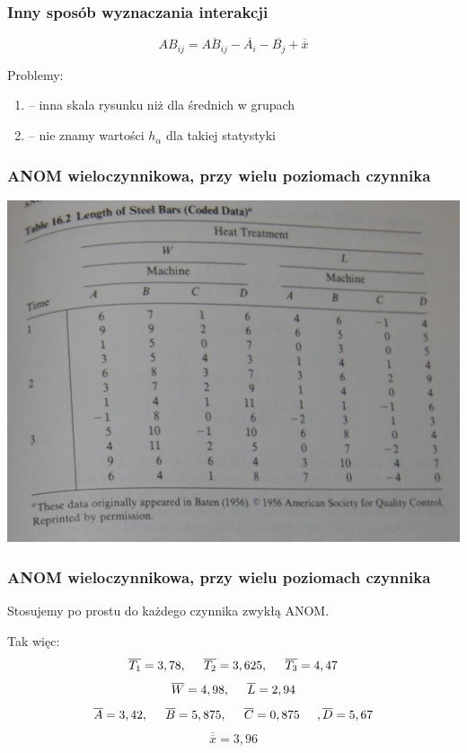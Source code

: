 \documentclass{beamer}
\begin{document}
\begin{frame}
\frametitle{Inny sposób wyznaczania interakcji}
$$
AB_{ij} =  \overline{AB_{ij}} - \overline{A_{i}} - \overline{B_{j}} + \overline{\overline{x}}
$$

\bigskip

Problemy:

\begin{enumerate}

\item[] -- inna skala rysunku niż dla średnich w grupach
\item[] -- nie znamy wartości $h_\alpha$ dla takiej statystyki

\end{enumerate}
\end{frame}

\begin{frame}
\frametitle{ANOM wieloczynnikowa, przy wielu poziomach czynnika}
\begin{center}
\includegraphics[scale=0.9]{tab.jpg}
\end{center}
\end{frame}

\begin{frame}
\frametitle{ANOM wieloczynnikowa, przy wielu poziomach czynnika}

Stosujemy po prostu do każdego czynnika zwykłą ANOM.

\bigskip

Tak więc:
$$
\overline{T_1} = 3,78, \hspace{5mm} \overline{T_2} = 3,625, \hspace{5mm} \overline{T_3} = 4,47
$$
$$
\overline{W} = 4,98, \hspace{5mm} \overline{L} = 2,94
$$
$$
\overline{A} = 3,42, \hspace{5mm} \overline{B} = 5,875, \hspace{5mm} \overline{C} = 0,875 \hspace{5mm}, \overline{D} = 5,67
$$
$$
\overline{\overline{x}} = 3,96
$$

\end{frame}
\end{document}

